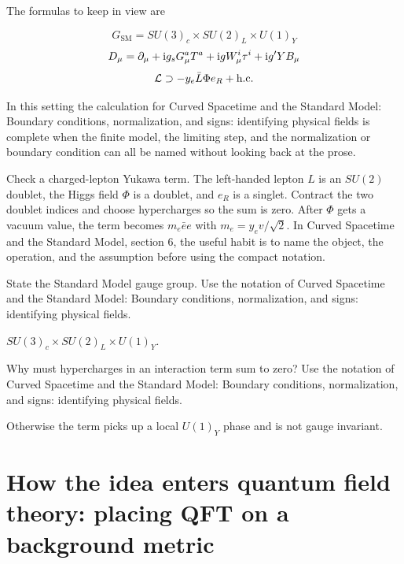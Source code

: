 The formulas to keep in view are

\[
  G_{\mathrm{SM}}=SU(3)_c\times SU(2)_L\times U(1)_Y
\]
\[
  D_\mu=\partial_\mu+\mathrm i g_sG_\mu^aT^a+\mathrm i gW_\mu^i\tau^i+\mathrm i g'YB_\mu
\]
\[
  \mathcal L\supset -y_e\bar L\Phi e_R+\hbox{h.c.}
\]

In this setting the calculation for Curved Spacetime and the Standard Model: Boundary conditions, normalization, and signs: identifying physical fields is complete when the finite model, the limiting step, and the normalization or boundary condition can all be named without looking back at the prose.




\begin{example}
Check a charged-lepton Yukawa term.  The left-handed lepton \(L\) is an \(SU(2)\) doublet, the Higgs field \(\Phi\) is a doublet, and \(e_R\) is a singlet.  Contract the two doublet indices and choose hypercharges so the sum is zero.  After \(\Phi\) gets a vacuum value, the term becomes \(m_e\bar e e\) with \(m_e=y_ev/\sqrt2\).  In Curved Spacetime and the Standard Model, section 6, the useful habit is to name the object, the operation, and the assumption before using the compact notation.
\end{example}



\begin{exercise}
State the Standard Model gauge group.  Use the notation of Curved Spacetime and the Standard Model: Boundary conditions, normalization, and signs: identifying physical fields.
\begin{answer}
\(SU(3)_c\times SU(2)_L\times U(1)_Y\).
\end{answer}
\end{exercise}

\begin{exercise}
Why must hypercharges in an interaction term sum to zero?  Use the notation of Curved Spacetime and the Standard Model: Boundary conditions, normalization, and signs: identifying physical fields.
\begin{answer}
Otherwise the term picks up a local \(U(1)_Y\) phase and is not gauge invariant.
\end{answer}
\end{exercise}



\section{How the idea enters quantum field theory: placing QFT on a background metric}

